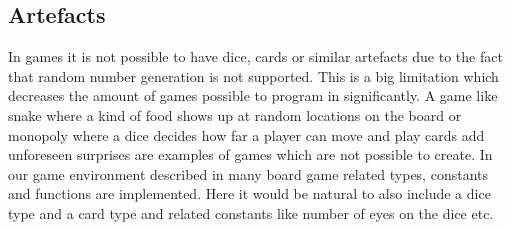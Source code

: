 \subsection{Artefacts}
\label{sec:artefacts}

In \productname{} games it is not possible to have dice, cards or similar artefacts due to the 
fact that random number generation is not supported. This is a big limitation which decreases the
amount of games possible to program in \productname{} significantly. A game like snake
where a kind of food shows up at random locations on the board or monopoly where a dice decides how
far a player can move and play cards add unforeseen surprises are examples of games which are not possible 
to create. In our game environment described in  
many board game related types, constants and functions are implemented. Here it would be natural to also include a
dice type and a card type and related constants like number of eyes on the dice etc.    